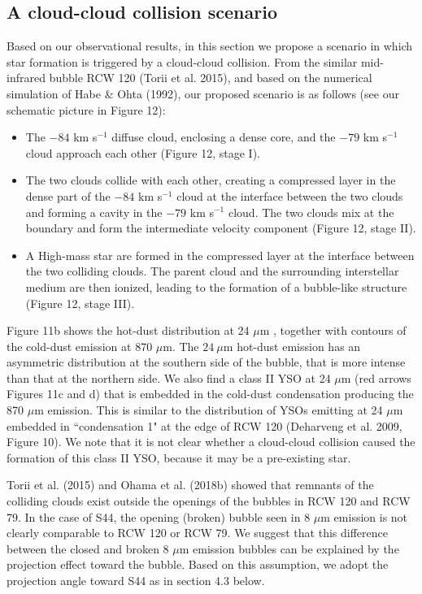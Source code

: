 \documentclass[onecolumn]{pasj01}
\begin{document}
{{{{\subsection{{A cloud-cloud collision scenario}}
{Based on our observational results}, in this section we propose {a scenario in which star formation is triggered by} a cloud-cloud collision.
{From} the similar mid-infrared bubble RCW 120 (Torii et al. 2015){, and} based on the numerical simulation of Habe \& Ohta (1992), our proposed scenario is as follows (see our schematic picture {in} {Figure 12}):
\begin{itemize}
\item {The $-84$ km s$^{-1}$ diffuse cloud, enclosing a dense core, and the $-79$ km s$^{-1}$ cloud approach each other ({Figure 12, stage I}).}
\item  The two clouds collide {with} each other{, creating} a compressed layer in the dense part of the $-84$ km s$^{-1}$ cloud at the interface {between} the two clouds and {forming} a cavity {in} the $-79$ km s$^{-1}$ cloud. The two {clouds} {mix at} the boundary {and form the intermediate velocity component} ({Figure 12, stage II}).
\item A High-mass star are formed in the compressed layer at the interface {between} the two colliding clouds. The parent cloud and {the} surrounding interstellar medium are {then} ionized, leading to the formation of {a} bubble-like structure ({Figure 12, stage III}).
\end{itemize}
{{Figure 11b} shows {the hot-dust} {distribution {at} 24 $\mu$m} {, together} with contours of {the} cold-dust emission {{at} 870 $\mu$m}. 
The $24\ \mu$m {hot-dust emission} has {an} asymmetric distribution at the southern side of the bubble, {that} is more intense than {that at the} northern side. 
We also find {a class II YSO at 24 $\mu$m} (red arrows Figures 11c and d) {that is} {embedded} in the cold-dust condensation {producing the} {870} $\mu$m emission. {This} is similar to the distribution of YSOs emitting {at} 24 $\mu$m embedded in “condensation 1" at the edge of RCW 120 (Deharveng et al. 2009, Figure 10). 
{We note that it is not clear whether a cloud-cloud collision caused the formation of this class II YSO, because it may be a pre-existing star.}

{Torii et al. (2015) and Ohama et al. (2018b) showed that  {remnants} of the {colliding} cloud{s} exist outside the opening{s} of the bubble{s in} RCW 120 and RCW 79.
In the case of S44, the opening (broken) {bubble {seen} in} 8 $\mu$m emission {is not} clearly {comparable to}  RCW 120 {or} RCW 79. 
{We suggest that this difference between {the} closed and broken 8 $\mu$m emission {bubbles} can {be explained by} the projection effect toward the bubble. {Based on {this} assumption, we adopt} the projection angle toward S44 as {} in section 4.3 {below}.}

}}}}}}
\end{document}
